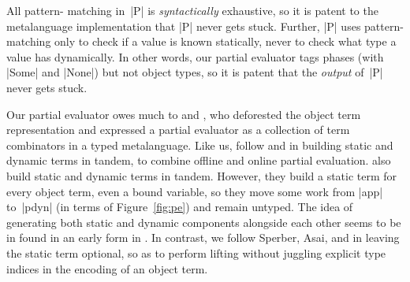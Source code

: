 All pattern\hyp
matching in~|P| is \emph{syntactically} exhaustive, so it is patent to the
metalanguage implementation that |P| never gets stuck.  Further,
|P| uses pattern\hyp matching
only to check if a value is known statically,
never to check what type a value has dynamically.
In other words, our partial evaluator tags
phases (with |Some| and |None|) but not object types, so it
is patent that the \emph{output} of~|P| never gets stuck.

Our partial evaluator owes much to
\citet{Thiemann-combinators} and \citet{sumii-hybrid}, who deforested
the object term representation and expressed a partial evaluator as a collection
of term combinators in a typed metalanguage.  Like us, \citeauthor{sumii-hybrid}
follow \citet{Sperber-SelfApplicable} and \citet{asai-binding-time} in building
static and dynamic terms in tandem, to combine offline and online partial
evaluation.
 also
build static and dynamic terms in tandem.  However, they
build a static term for every object term, even a bound variable,
so they move some work from |app| to~|pdyn| (in terms of Figure~\ref{fig:pe})
and remain untyped.  
The idea of generating both static and dynamic components alongside each
other seems to be in found in an early form in \citet[\S5]{consel-schism-93}. 
In contrast, we follow Sperber, Asai,
and \citeauthor{sumii-hybrid} in leaving the static term
optional, so as to perform lifting without
juggling explicit type indices in the encoding of an object term.

